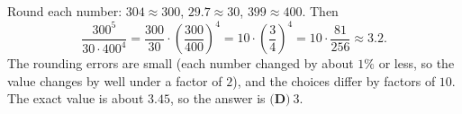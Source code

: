 Round each number: $304\approx300$, $29.7\approx30$, $399\approx400$. Then
\[
\dfrac{300^5}{30\cdot400^4}=\dfrac{300}{30}\cdot\left(\dfrac{300}{400}\right)^4=10\cdot\left(\dfrac{3}{4}\right)^4=10\cdot\dfrac{81}{256}\approx3.2 .
\]
The rounding errors are small (each number changed by about $1\%$ or less, so the value changes by well under a factor of $2$), and the choices differ by factors of $10$. The exact value is about $3.45$, so the answer is $\boxed{\textbf{(D)}\ 3}$.
